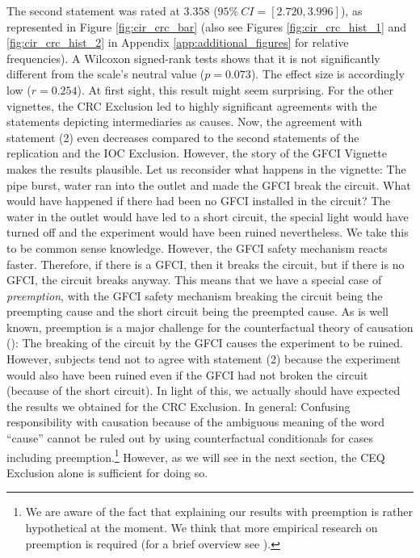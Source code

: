 \documentclass[egregdoesnotlikesansseriftitles,12pt]{scrartcl}
\begin{document}
\noindent The second statement was rated at $3.358$ ($95\%~CI=[2.720,3.996]$), as represented in Figure \ref{fig:cir_crc_bar} (also see Figures \ref{fig:cir_crc_hist_1} and \ref{fig:cir_crc_hist_2} in Appendix \ref{app:additional_figures} for relative frequencies). A Wilcoxon signed-rank tests shows that it is not significantly different from the scale's neutral value ($p=0.073$). The effect size is accordingly low ($r=0.254$). At first sight, this result might seem surprising. For the other vignettes, the CRC Exclusion led to highly significant agreements with the statements depicting intermediaries as causes. Now, the agreement with statement (2) even decreases compared to the second statements of the replication and the IOC Exclusion. However, the story of the GFCI Vignette makes the results plausible. Let us reconsider what happens in the vignette: The pipe burst, water ran into the outlet and made the GFCI break the circuit. What would have happened if there had been no GFCI installed in the circuit? The water in the outlet would have led to a short circuit, the special light would have turned off and the experiment would have been ruined nevertheless. We take this to be common sense knowledge. However, the GFCI safety mechanism reacts faster. Therefore, if there is a GFCI, then it breaks the circuit, but if there is no GFCI, the circuit breaks anyway. This means that we have a special case of \textit{preemption}, with the GFCI safety mechanism breaking the circuit being the preempting cause and the short circuit being the preempted cause. As is well known, preemption is a major challenge for the counterfactual theory of causation (\cite{lewis_causation_1973}): The breaking of the circuit by the GFCI causes the experiment to be ruined. However, subjects tend not to agree with statement (2) because the experiment would also have been ruined even if the GFCI had not broken the circuit (because of the short circuit). In light of this, we actually should have expected the results we obtained for the CRC Exclusion. In general: Confusing responsibility with causation because of the ambiguous meaning of the word ``cause'' cannot be ruled out by using counterfactual conditionals for cases including preemption.\footnote{We are aware of the fact that explaining our results with preemption is rather hypothetical at the moment. We think that more empirical research on preemption is required (for a brief overview see \citealt{henne_experimental_forthcoming}).} However, as we will see in the next section, the CEQ Exclusion alone is sufficient for doing so.
\end{document}
